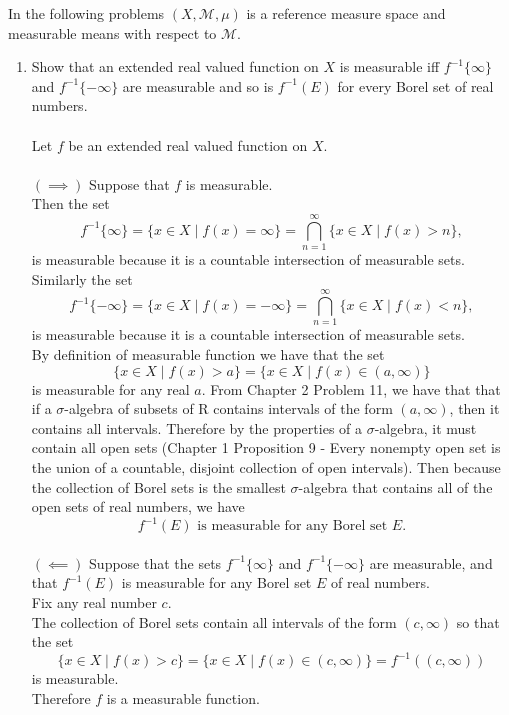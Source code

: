 In the following problems $(X,\mathcal{M},\mu)$ is a reference measure space and measurable means with respect to $\mathcal{M}$.
\begin{enumerate}
	\setcounter{enumi}{0}
    \item Show that an extended real valued function on $X$ is measurable iff $f^{-1}\{\infty\}$ and $f^{-1}\{-\infty\}$ are measurable and so is $f^{-1}(E)$ for every Borel set of real numbers.\\
    \\Let $f$ be an extended real valued function on $X$.\\
    \\$(\implies)$ Suppose that $f$ is measurable. 
    \\Then the set
    \[
        f^{-1}\{\infty\}=\{x\in X\mid f(x)=\infty\}=\bigcap_{n=1}^\infty\{x\in X\mid f(x)>n\},
    \]
    is measurable because it is a countable intersection of measurable sets.
    \\Similarly the set
    \[
        f^{-1}\{-\infty\}=\{x\in X\mid f(x)=-\infty\}=\bigcap_{n=1}^\infty\{x\in X\mid f(x)<n\},
    \]
    is measurable because it is a countable intersection of measurable sets.
    \\By definition of measurable function we have that the set
    \[
        \{x\in X\mid f(x)>a\}=\{x\in X\mid f(x)\in(a,\infty)\}
    \]
    is measurable for any real $a$.
    From Chapter 2 Problem 11, we have that that if a $\sigma$-algebra of subsets of R contains intervals of the form $(a,\infty)$, then it contains all intervals.
    Therefore by the properties of a $\sigma$-algebra, it must contain all open sets (Chapter 1 Proposition 9 - Every nonempty open set is the union of a countable, disjoint collection of open intervals).
    Then because the collection of Borel sets is the smallest $\sigma$-algebra that contains all of the open sets of real numbers, we have
    \[
        f^{-1}(E)\text{ is measurable for any Borel set }E.
    \]
    \\$(\impliedby)$ Suppose that the sets $f^{-1}\{\infty\}$ and $f^{-1}\{-\infty\}$ are measurable, and that $f^{-1}(E)$ is measurable for any Borel set $E$ of real numbers.
    \\Fix any real number $c$.
    \\The collection of Borel sets contain all intervals of the form $(c,\infty)$ so that the set
    \[
        \{x\in X\mid f(x)> c\}=\{x\in X\mid f(x)\in(c,\infty)\}=f^{-1}((c,\infty))
    \]
    is measurable.
    \\Therefore $f$ is a measurable function.

\end{enumerate}
